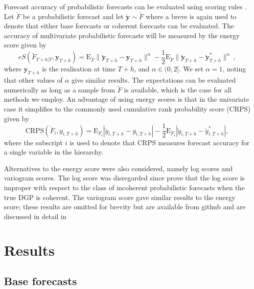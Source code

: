 \documentclass[graybox]{svmult}
\def\E{\text{E}}
\begin{document}
Forecast accuracy of probabilistic forecasts can be evaluated using scoring rules \citep{Gneiting2014}. Let $\breve{F}$ be a probabilistic forecast and let $\breve{\bm{y}}\sim \breve{F}$ where a breve is again used to denote that either base forecasts or coherent forecasts can be evaluated. The accuracy of multivariate probabilistic forecasts will be measured by the energy score given by
\begin{equation*}
	eS(\breve{F}_{T+h|T},\bm{y}_{T+h}) =
	\E_{\breve{F}}\|\breve{\bm{y}}_{T+h}-\bm{y}_{T+h}\|^\alpha
	-\frac{1}{2}\E_{\breve{F}}\|\breve{\bm{y}}_{T+h}-\breve{\bm{y}}^*_{T+h}\|^\alpha\,,
\end{equation*} where $\bm{y}_{T+h}$ is the realisation at time $T+h$, and $\alpha\in (0,2]$. We set $\alpha=1$, noting that other values of $\alpha$ give similar results. The expectations can be evaluated numerically as long as a sample from $\breve{F}$ is available, which is the case for all methods we employ. An advantage of using energy scores is that in the univariate case it simplifies to the commonly used cumulative rank probability score (CRPS) given by
\begin{equation*}
	\text{CRPS}(\breve{F}_i,y_{i,T+h}) = \E_{\breve{F}_i}|\breve{y}_{i,T+h}-y_{i,T+h}| - \frac{1}{2}\E_{\breve{F}_i}|\breve{y}_{i,T+h}-\breve{y}^*_{i,T+h}|,
\end{equation*}
where the subscript $i$ is used to denote that CRPS measures forecast accuracy for a single variable in the hierarchy.

Alternatives to the energy score were also considered, namely log scores and variogram scores. The log score was disregarded since \citet{GamEtAl2018} prove that the log score is improper with respect to the class of incoherent probabilistic forecasts when the true DGP is coherent. The variogram score gave similar results to the energy score;  these results are omitted for brevity but are available from github and are discussed in detail in \cite{gamakumara2019phd}


\section{Results}\label{sec:results}

\subsection{Base forecasts}
\end{document}
